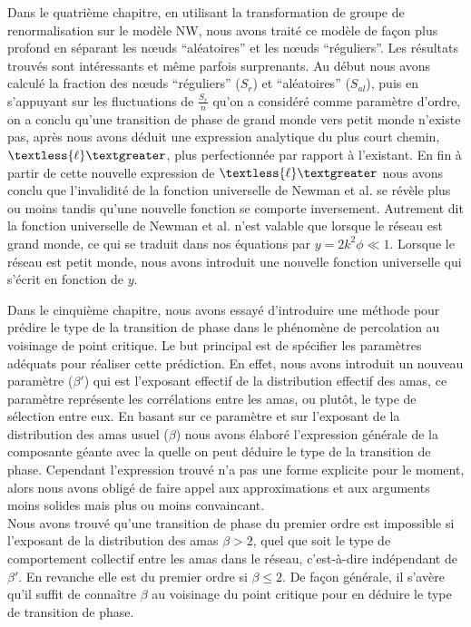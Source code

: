 Dans le quatrième chapitre, en utilisant la transformation de groupe de renormalisation sur le modèle NW, nous avons traité ce modèle de façon plus profond en séparant les nœuds ``aléatoires'' et les nœuds ``réguliers''. Les résultats trouvés sont intéressants et même parfois surprenants. Au début nous avons calculé la fraction des nœuds ``réguliers''  ($S_r$) et ``aléatoires'' ($S_{al}$), puis en s'appuyant sur les fluctuations de $\frac {S_r}{n}$ qu'on a considéré comme paramètre d'ordre, on a conclu qu'une transition de phase de grand monde vers petit monde n'existe pas, après nous avons déduit une expression analytique du plus court chemin, $\textless {\ell} \textgreater$, plus perfectionnée par rapport à l'existant. En fin à partir de cette nouvelle expression de $\textless {\ell} \textgreater$ nous avons conclu que l'invalidité de la fonction universelle de Newman et al. \cite{Newman-Watts1999-2} se révèle  plus ou moins tandis qu'une nouvelle fonction se comporte inversement. Autrement dit la fonction universelle de Newman et al. \cite{Newman-Watts1999-2} n'est valable que lorsque le réseau est grand monde, ce qui se traduit dans nos équations par $y=2k^2\phi \ll 1$. Lorsque le réseau est petit monde, nous avons introduit une nouvelle fonction universelle qui s'écrit en fonction de $y$.


Dans le cinquième chapitre, nous avons essayé d'introduire une méthode pour prédire le type de la transition de phase dans le phénomène de percolation au voisinage de point critique. Le but principal est de spécifier les paramètres adéquats pour réaliser cette prédiction. En effet, nous avons introduit un nouveau paramètre ($\beta'$) qui est l'exposant  effectif de la distribution effectif des amas, ce paramètre représente les corrélations entre les amas, ou plutôt, le type de sélection entre eux. En basant sur ce paramètre et  sur l'exposant de la distribution des amas usuel ($\beta$) nous avons élaboré l'expression générale de la composante géante avec la quelle on peut déduire le type de la transition de phase. Cependant l'expression trouvé n'a pas une forme explicite pour le moment, alors nous avons obligé de faire appel aux approximations et aux arguments moins solides mais plus ou moins convaincant. \\
Nous avons trouvé qu'une transition de phase du premier ordre est impossible si l'exposant de la distribution des amas $\beta>2$, quel que soit le type de comportement collectif entre les amas  dans le réseau, c'est-à-dire indépendant de $\beta'$. En revanche elle est du premier ordre si $\beta\leq2$. De façon générale, il s'avère qu'il suffit de connaître $\beta$ au voisinage du point critique pour en déduire le type de transition de phase.\\  